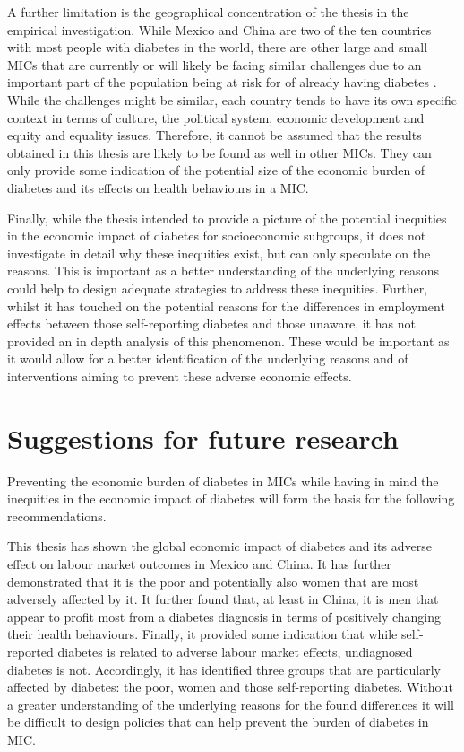 A further limitation is the geographical concentration of the thesis in the empirical investigation. While Mexico and China are two of the ten countries with most people with diabetes in the world, there are other large and small \acp{MIC} that are currently or will likely be facing similar challenges due to an important part of the population being at risk for of already having diabetes \parencite{Risk2016}. While the challenges might be similar, each country tends to have its own specific context in terms of culture, the political system, economic development and equity and equality issues. Therefore, it cannot be assumed that the results obtained in this thesis are likely to be found as well in other \acp{MIC}. They can only provide some indication of the potential size of the economic burden of diabetes and its effects on health behaviours in a \ac{MIC}.

Finally, while the thesis intended to provide a picture of the potential inequities in the economic impact of diabetes for socioeconomic subgroups, it does not investigate in detail why these inequities exist, but can only speculate on the reasons. This is important as a better understanding of the underlying reasons could help to design adequate strategies to address these inequities. Further, whilst it has touched on the potential reasons for the differences in employment effects between those self-reporting diabetes and those unaware, it has not provided an in depth analysis of this phenomenon. These would be important as it would allow for a better identification of the underlying reasons and of interventions aiming to prevent these adverse economic effects. 



\section{Suggestions for future research}

Preventing the economic burden of diabetes in \acp{MIC} while having in mind the inequities in the economic impact of diabetes will form the basis for the following recommendations.

This thesis has shown the global economic impact of diabetes and its adverse effect on labour market outcomes in Mexico and China. It has further demonstrated that it is the poor and potentially also women that are most adversely affected by it. It further found that, at least in China, it is men that appear to profit most from a diabetes diagnosis in terms of positively changing their health behaviours. Finally, it provided some indication that while self-reported diabetes is related to adverse labour market effects, undiagnosed diabetes is not. Accordingly, it has identified three groups that are particularly affected by diabetes: the poor, women and those self-reporting diabetes. Without a greater understanding of the underlying reasons for the found differences it will be difficult to design policies that can help prevent the burden of diabetes in \ac{MIC}.

